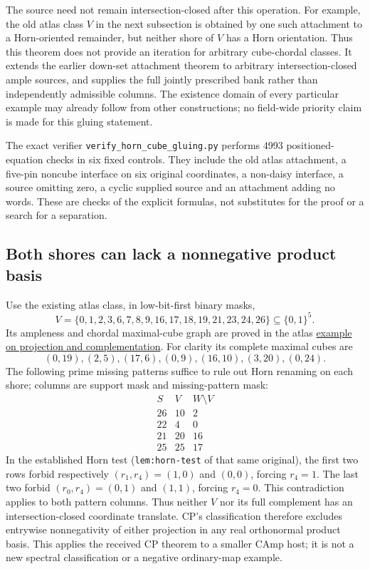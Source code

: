 \documentclass[11pt]{article}
\theoremstyle{definition}
\begin{document}
The source need not remain intersection-closed after this operation.
For example, the old atlas class $V$ in the next subsection is obtained by
one such attachment to a Horn-oriented remainder, but neither shore of
$V$ has a Horn orientation. Thus this theorem does not provide an
iteration for arbitrary cube-chordal classes. It extends the earlier
down-set attachment theorem to arbitrary intersection-closed ample sources,
and supplies the full jointly prescribed bank rather than independently
admissible columns. The existence domain of every particular example
may already follow from other constructions; no field-wide priority
claim is made for this gluing statement.

The exact verifier \texttt{verify\_horn\_cube\_gluing.py} performs 4993
positioned-equation checks in six fixed controls. They include the old atlas
attachment, a five-pin noncube interface on six original coordinates,
a non-daisy interface, a source omitting zero, a cyclic supplied source
and an attachment adding no words. These are checks of the explicit
formulas, not substitutes for the proof or a search for a separation.

\subsection{Both shores can lack a nonnegative product basis}
\label{sec:two-shore-horn-obstruction}
Use the existing atlas class, in low-bit-first binary masks,
\[
 V=\{0,1,2,3,6,7,8,9,16,17,18,19,21,23,24,26\}\subseteq\{0,1\}^5.
\]
Its ampleness and chordal maximal-cube graph are proved in the atlas
\href{../../minor-atlas/sections/cube_chordal_ample.tex}
{example on projection and complementation}.
For clarity its complete maximal cubes are
\[
 (0,19),(2,5),(17,6),(0,9),(16,10),(3,20),(0,24).
\]
The following prime missing patterns suffice to rule out Horn renaming
on each shore; columns are support mask and missing-pattern mask:
\[
\begin{array}{c|cc}
 S& V& W\setminus V\\\hline
26&10&2\\
22&4&0\\
21&20&16\\
25&25&17
\end{array}
\]
In the established Horn test (\texttt{lem:horn-test} of that same original),
the first two rows forbid respectively
$(r_1,r_4)=(1,0)$ and $(0,0)$, forcing $r_4=1$.
The last two forbid $(r_0,r_4)=(0,1)$ and $(1,1)$, forcing $r_4=0$.
This contradiction applies to both pattern columns. Thus neither $V$
nor its full complement has an intersection-closed coordinate translate.
CP's classification therefore excludes entrywise nonnegativity of either
projection in any real orthonormal product basis. This applies the received
CP theorem to a smaller CAmp host; it is not a new spectral classification
or a negative ordinary-map example.
\end{document}
